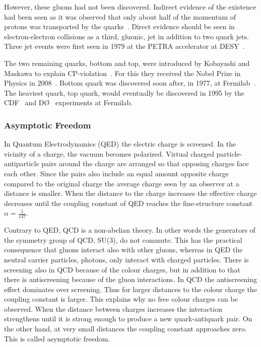 However, these gluons had not been discovered. Indirect evidence of the existence had been seen as it was observed that only about half of the momentum of protons was transported by the quarks~\cite{25gluons}. Direct evidence should be seen in electron-electron collisions as a third, gluonic, jet in addition to two quark jets. Three jet events were first seen in 1979 at the PETRA accelerator at DESY~\cite{Brandelik1979243, PhysRev.43.830, Berger1979418}.

The two remaining quarks, bottom and top, were introduced by Kobayashi and Maskawa to explain CP-violation~\cite{Kobayashi:1973fv}. For this they received the Nobel Prize in Physics in 2008~\cite{Nobel2008}. Bottom quark was discovered soon after, in 1977, at Fermilab~\cite{Herb:1977ek}. The heaviest quark, top quark, would eventually be discovered in 1995 by the CDF~\cite{Abe:1995hr} and DØ~\cite{Abachi:1994td} experiments at Fermilab.




\subsubsection{Asymptotic Freedom}
In Quantum Electrodynamics (QED) the electric charge is screened. In the vicinity of a charge, the vacuum becomes polarized. Virtual charged particle-antiparticle pairs around the charge are arranged so that opposing charges face each other. Since the pairs also include an equal amount opposite charge compared to the original charge the average charge seen by an observer at a distance is smaller. When the distance to the charge increases the effective charge decreases until the coupling constant of QED reaches the fine-structure constant $\alpha=\frac{1}{137}$.~\cite{Perkins:1982xb}

Contrary to QED, QCD is a non-abelian theory. In other words the generators of the symmetry group of QCD, SU(3), do not commute. This has the practical consequence that gluons interact also with other gluons, whereas in QED the neutral carrier particles, photons, only interact with charged particles.
There is screening also in QCD because of the colour charges, but in addition to that there is antiscreening because of the gluon interactions. In QCD the antiscreening effect dominates over screening. Thus for larger distances to the colour charge the coupling constant is larger. This explains why no free colour charges can be observed. When the distance between charges increases the interaction strengthens until it is strong enough to produce a new quark-antiquark pair. On the other hand, at very small distances the coupling constant approaches zero. This is called asymptotic freedom.~\cite{Perkins:1982xb}

